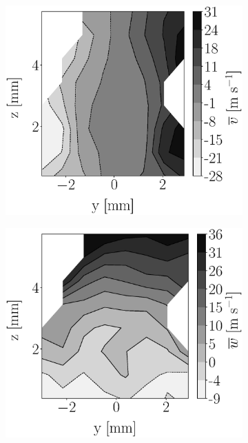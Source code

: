 \begin{figure}[h!]
\begin{subfigure}[b]{0.22\textwidth}
\end{subfigure}
   \hspace{0.17in}
\begin{subfigure}[b]{0.22\textwidth}
	\centering
   \includegraphics[scale=0.17]{./part2_developments/figures_ch5_resolved_JICF/injectors_SLI/uG75_dx10_x05_uy_mean_map.eps}
\end{subfigure}
   \hspace{0.17in}
\begin{subfigure}[b]{0.22\textwidth}
	\centering
   \includegraphics[scale=0.17]{./part2_developments/figures_ch5_resolved_JICF/injectors_SLI/uG75_dx10_x05_uz_mean_map.eps}
\end{subfigure}


\end{figure}
